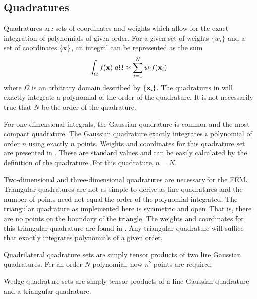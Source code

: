   \subsection{Quadratures}
    \label{sec:quadratures}
    Quadratures are sets of coordinates and weights which allow for the exact 
    integration of polynomials of given order. For a given set of weights 
    $\{w_i\}$ and a set of coordinates $\{\mathbf{x}\}$, an integral can be represented
    as the sum
    \begin{equation}
      \label{eq:quadrature}
      \int_{\Omega} f(\mathbf{x}) \;d\Omega \approx \sum_{i=1}^{N} w_i f(\mathbf{x}_i)
    \end{equation}
    where $\Omega$ is an arbitrary domain described by $\{\mathbf{x}_i\}$. The 
    quadratures in  will exactly integrate a polynomial of
    the order of the quadrature. It is not necessarily true that $N$ be the 
    order of the quadrature.
    
    For one-dimensional integrals, the Gaussian quadrature is common and the 
    most compact quadrature. The Gaussian quadrature exactly integrates a 
    polynomial of order $n$ using exactly $n$ points. Weights and coordinates
    for this quadrature set are presented in \cite{gaussianQuadrature}. These
    are standard values and can be easily calculated by the definition of the
    quadrature. For this quadrature, $n=N$.
    
    Two-dimensional and three-dimensional quadratures are necessary for the 
    FEM. Triangular quadratures are not as simple to derive
    as line quadratures and the number of points need not equal the order of the
    polynomial integrated. The triangular quadrature as implemented here is 
    symmetric and open. That is, there are no points on the boundary of the 
    triangle. The weights and coordinates for this triangular quadrature are 
    found in \cite{triangleQuadrature}. Any triangular quadrature will suffice
    that exactly integrates polynomials of a given order.
    
    Quadrilateral quadrature sets are simply tensor products of two line 
    Gaussian quadratures. For an order $N$ polynomial, now $n^2$ points are 
    required. 
    
    Wedge quadrature sets are simply tensor products of a line Gaussian 
    quadrature and a triangular quadrature. 
    
